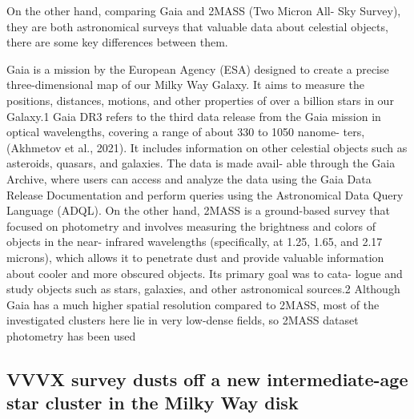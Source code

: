 \documentclass[../main.tex]{subfiles}
\begin{document}
{On the other hand, comparing Gaia and 2MASS (Two Micron All-
Sky Survey), they are both astronomical surveys that valuable data
about celestial objects, there are some key differences between them.

Gaia is a mission by the European Agency (ESA) designed to create
a precise three-dimensional map of our Milky Way Galaxy. It aims to
measure the positions, distances, motions, and other properties of over
a billion stars in our Galaxy.1
Gaia DR3 refers to the third data release from the Gaia mission in
optical wavelengths, covering a range of about 330 to 1050 nanome-
ters, (Akhmetov et al., 2021). It includes information on other celestial
objects such as asteroids, quasars, and galaxies. The data is made avail-
able through the Gaia Archive, where users can access and analyze the
data using the Gaia Data Release Documentation and perform queries
using the Astronomical Data Query Language (ADQL). On the other
hand, 2MASS is a ground-based survey that focused on photometry and
involves measuring the brightness and colors of objects in the near-
infrared wavelengths (specifically, at 1.25, 1.65, and 2.17 microns),
which allows it to penetrate dust and provide valuable information
about cooler and more obscured objects. Its primary goal was to cata-
logue and study objects such as stars, galaxies, and other astronomical
sources.2 Although Gaia has a much higher spatial resolution compared
to 2MASS, most of the investigated clusters here lie in very low-dense
fields, so 2MASS dataset photometry has been used

\subsection{VVVX survey dusts off a new intermediate-age star cluster in the
	Milky Way disk}


}
\end{document}
